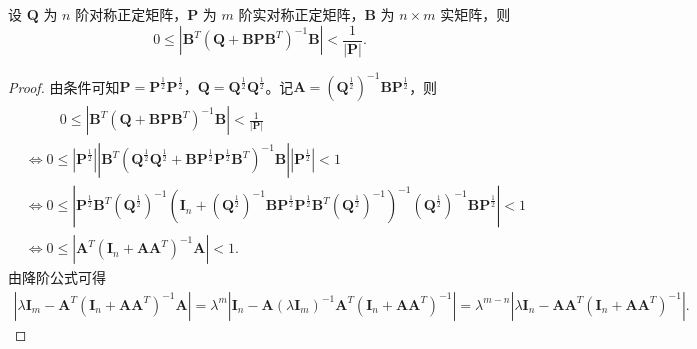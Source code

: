 \documentclass[../../main.tex]{subfiles}%
\begin{document}
\begin{example}\label{example:例题9.3112223444}
设 $\boldsymbol{Q}$ 为 $n$ 阶对称正定矩阵，$\boldsymbol{P}$ 为 $m$ 阶实对称正定矩阵，$\boldsymbol{B}$ 为 $n \times m$ 实矩阵，则
$$0 \leqslant |\boldsymbol{B}^{T}(\boldsymbol{Q} + \boldsymbol{B}\boldsymbol{P}\boldsymbol{B}^{T})^{-1}\boldsymbol{B}| < \frac{1}{|\boldsymbol{P}|}.$$
\end{example}
\begin{proof}
由条件可知$\boldsymbol{P} = \boldsymbol{P}^{\frac{1}{2}}\boldsymbol{P}^{\frac{1}{2}}$，$\boldsymbol{Q} = \boldsymbol{Q}^{\frac{1}{2}}\boldsymbol{Q}^{\frac{1}{2}}$。记$\boldsymbol{A} = \left( \boldsymbol{Q}^{\frac{1}{2}} \right)^{-1}\boldsymbol{B}\boldsymbol{P}^{\frac{1}{2}}$，则
\begin{align*}
&\qquad\,\,\, 0 \leqslant |\boldsymbol{B}^{T}(\boldsymbol{Q} + \boldsymbol{B}\boldsymbol{P}\boldsymbol{B}^{T})^{-1}\boldsymbol{B}| < \frac{1}{|\boldsymbol{P}|}
\\
&\Longleftrightarrow 0 \leqslant \left| \boldsymbol{P}^{\frac{1}{2}} \right| \left| \boldsymbol{B}^{T} \left( \boldsymbol{Q}^{\frac{1}{2}}\boldsymbol{Q}^{\frac{1}{2}} + \boldsymbol{B}\boldsymbol{P}^{\frac{1}{2}}\boldsymbol{P}^{\frac{1}{2}}\boldsymbol{B}^{T} \right)^{-1}\boldsymbol{B} \right| \left| \boldsymbol{P}^{\frac{1}{2}} \right| < 1 \\
&\Longleftrightarrow 0 \leqslant \left| \boldsymbol{P}^{\frac{1}{2}}\boldsymbol{B}^{T} \left( \boldsymbol{Q}^{\frac{1}{2}} \right)^{-1} \left( \boldsymbol{I}_n + \left( \boldsymbol{Q}^{\frac{1}{2}} \right)^{-1}\boldsymbol{B}\boldsymbol{P}^{\frac{1}{2}}\boldsymbol{P}^{\frac{1}{2}}\boldsymbol{B}^{T} \left( \boldsymbol{Q}^{\frac{1}{2}} \right)^{-1} \right)^{-1} \left( \boldsymbol{Q}^{\frac{1}{2}} \right)^{-1}\boldsymbol{B}\boldsymbol{P}^{\frac{1}{2}} \right| < 1 \\
&\Longleftrightarrow 0 \leqslant \left| \boldsymbol{A}^{T}(\boldsymbol{I}_n + \boldsymbol{A}\boldsymbol{A}^{T})^{-1}\boldsymbol{A} \right| < 1.
\end{align*}
由降阶公式可得
\begin{align*}
\left| \lambda \boldsymbol{I}_m - \boldsymbol{A}^{T} \left( \boldsymbol{I}_n + \boldsymbol{A}\boldsymbol{A}^{T} \right)^{-1}\boldsymbol{A} \right| = \lambda^m \left| \boldsymbol{I}_n - \boldsymbol{A} \left( \lambda \boldsymbol{I}_m \right)^{-1}\boldsymbol{A}^{T} \left( \boldsymbol{I}_n + \boldsymbol{A}\boldsymbol{A}^{T} \right)^{-1} \right| = \lambda^{m-n} \left| \lambda \boldsymbol{I}_n - \boldsymbol{A}\boldsymbol{A}^{T} \left( \boldsymbol{I}_n + \boldsymbol{A}\boldsymbol{A}^{T} \right)^{-1} \right|.

\end{align*}
\end{proof}
\end{document}
